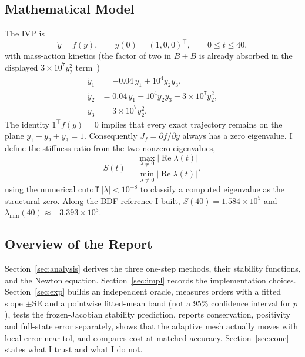 \documentclass[11pt,a4paper]{article}
\begin{document}
\subsection{Mathematical Model}
The IVP is
\begin{equation}
\dot y = f(y),\qquad
y(0)=(1,0,0)^\top,\qquad 0\le t\le 40,
\end{equation}
with mass-action kinetics (the factor of two in \(B+B\) is already absorbed in the displayed \(3\times 10^7 y_2^2\) term~\cite{problemPack})
\begin{equation}
\begin{aligned}
\dot y_1 &= -0.04\, y_1 + 10^4 y_2 y_3,\\
\dot y_2 &= 0.04\, y_1 - 10^4 y_2 y_3 - 3\times 10^7 y_2^2,\\
\dot y_3 &= 3\times 10^7 y_2^2.
\end{aligned}
\label{eq:rhs}
\end{equation}
The identity \(1^\top f(y)=0\) implies that every exact trajectory remains on the plane \(y_1+y_2+y_3=1\). Consequently \(J_f=\partial f/\partial y\) always has a zero eigenvalue. I define the stiffness ratio from the two nonzero eigenvalues,
\begin{equation}
S(t)=\frac{\max_{\lambda\neq 0}|\operatorname{Re}\lambda(t)|}{\min_{\lambda\neq 0}|\operatorname{Re}\lambda(t)|},
\end{equation}
using the numerical cutoff \(|\lambda|<10^{-8}\) to classify a computed eigenvalue as the structural zero. Along the BDF reference I built, \(S(40)=1.584\times 10^5\) and \(\lambda_{\min}(40)\approx -3.393\times 10^3\).

\subsection{Overview of the Report}
Section~\ref{sec:analysis} derives the three one-step methods, their stability functions, and the Newton equation. Section~\ref{sec:impl} records the implementation choices. Section~\ref{sec:exp} builds an independent oracle, measures orders with a fitted slope \(\pm\mathrm{SE}\) and a pointwise fitted-mean band (not a 95\% confidence interval for \(p\)), tests the frozen-Jacobian stability prediction, reports conservation, positivity and full-state error separately, shows that the adaptive mesh actually moves with local error near \(\mathrm{tol}\), and compares cost at matched accuracy. Section~\ref{sec:conc} states what I trust and what I do not.

\end{document}
